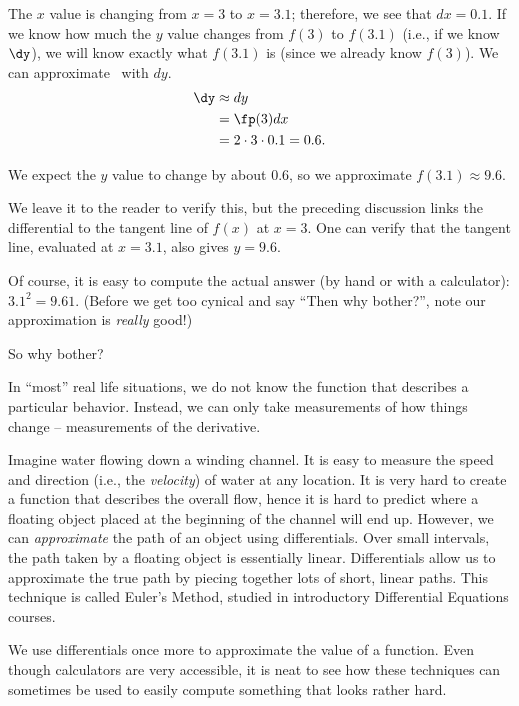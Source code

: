 {The $x$ value is changing from $x=3$ to $x=3.1$; therefore, we see that $dx=0.1$. If we know how much the $y$ value changes from $f(3)$ to $f(3.1)$ (i.e., if we know $\dy$), we will know exactly what $f(3.1)$ is (since we already know $f(3)$). We can approximate \dy\ with $dy$.
\begin{align*}
	\dy &\approx dy \\
	&= \fp(3)dx \\
	&= 2\cdot 3\cdot 0.1 = 0.6.
\end{align*}

We expect the $y$ value to change by about $0.6$, so we approximate $f(3.1) \approx 9.6.$

We leave it to the reader to verify this, but the preceding discussion links the differential to the tangent line of $f(x)$ at $x=3$. One can verify that the tangent line, evaluated at $x=3.1$, also gives $y=9.6$.}

Of course, it is easy to compute the actual answer (by hand or with a calculator): $3.1^2 = 9.61.$ (Before we get too cynical and say ``Then why bother?'', note our approximation is \textit{really} good!)

So why bother?

In ``most'' real life situations, we do not know the function that describes a particular behavior. Instead, we can only take measurements of how things change -- measurements of the derivative.

Imagine water flowing down a winding channel. It is easy to measure the speed and direction (i.e., the \textit{velocity}) of water at any location. It is very hard to create a function that describes the overall flow, hence it is hard to predict where a floating object placed at the beginning of the channel will end up. However, we can \textit{approximate} the path of an object using differentials. Over small intervals, the path taken by a floating object is essentially linear. Differentials allow us to approximate the true path by piecing together lots of short, linear paths. This technique is called Euler's Method, studied in introductory Differential Equations courses.

We use differentials once more to approximate the value of a function. Even though calculators are very accessible, it is neat to see how these techniques can sometimes be used to easily compute something that looks rather hard.\\


